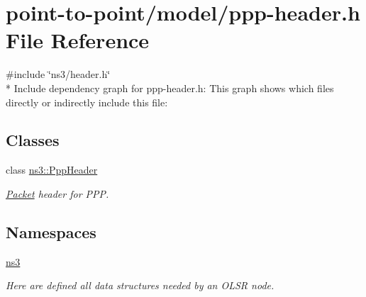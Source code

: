 \hypertarget{ppp-header_8h}{}\section{point-\/to-\/point/model/ppp-\/header.h File Reference}
\label{ppp-header_8h}
{\ttfamily \#include \char`\"{}ns3/header.\+h\char`\"{}}\\*
Include dependency graph for ppp-\/header.h\+:
This graph shows which files directly or indirectly include this file\+:
\subsection*{Classes}
\begin{DoxyCompactItemize}
\item 
class \hyperlink{classns3_1_1PppHeader}{ns3\+::\+Ppp\+Header}
\begin{DoxyCompactList}\small\item\em \hyperlink{classns3_1_1Packet}{Packet} header for P\+PP. \end{DoxyCompactList}\end{DoxyCompactItemize}
\subsection*{Namespaces}
\begin{DoxyCompactItemize}
\item 
 \hyperlink{namespacens3}{ns3}
\begin{DoxyCompactList}\small\item\em Here are defined all data structures needed by an O\+L\+SR node. \end{DoxyCompactList}\end{DoxyCompactItemize}
